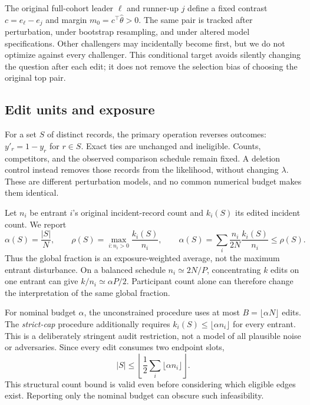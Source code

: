 \documentclass{article}
\begin{document}
The original full-cohort leader $\ell$ and runner-up $j$ define a fixed contrast $c=e_\ell-e_j$ and margin $m_0=c^\top\widehat\theta>0$. The same pair is tracked after perturbation, under bootstrap resampling, and under altered model specifications. Other challengers may incidentally become first, but we do not optimize against every challenger. This conditional target avoids silently changing the question after each edit; it does not remove the selection bias of choosing the original top pair.

\subsection{Edit units and exposure}\label{sec:exposure}
For a set $S$ of distinct records, the primary operation reverses outcomes: $y'_r=1-y_r$ for $r\in S$. Exact ties are unchanged and ineligible. Counts, competitors, and the observed comparison schedule remain fixed. A deletion control instead removes those records from the likelihood, without changing $\lambda$. These are different perturbation models, and no common numerical budget makes them identical.

Let $n_i$ be entrant $i$'s original incident-record count and $k_i(S)$ its edited incident count. We report
\begin{equation}\label{eq:exposure}
 \alpha(S)=\frac{|S|}{N},\qquad
 \rho(S)=\max_{i:n_i>0}\frac{k_i(S)}{n_i},\qquad
 \alpha(S)=\sum_i\frac{n_i}{2N}\frac{k_i(S)}{n_i}\leq\rho(S).
\end{equation}
Thus the global fraction is an exposure-weighted average, not the maximum entrant disturbance. On a balanced schedule $n_i\simeq 2N/P$, concentrating $k$ edits on one entrant can give $k/n_i\simeq\alpha P/2$. Participant count alone can therefore change the interpretation of the same global fraction.

For nominal budget $\alpha$, the unconstrained procedure uses at most $B=\lfloor\alpha N\rfloor$ edits. The \emph{strict-cap} procedure additionally requires $k_i(S)\leq\lfloor\alpha n_i\rfloor$ for every entrant. This is a deliberately stringent audit restriction, not a model of all plausible noise or adversaries. Since every edit consumes two endpoint slots,
\begin{equation}\label{eq:countbound}
 |S|\leq\left\lfloor\frac12\sum_i\lfloor\alpha n_i\rfloor\right\rfloor.
\end{equation}
This structural count bound is valid even before considering which eligible edges exist. Reporting only the nominal budget can obscure such infeasibility.
\end{document}
